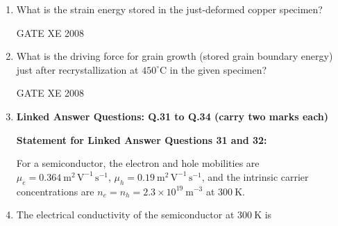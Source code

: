 \documentclass[12pt]{article}
\begin{document}
\begin{enumerate}
\item What is the strain energy stored in the just-deformed copper specimen?

\begin{enumerate}
\end{enumerate}

GATE XE 2008

\item What is the driving force for grain growth (stored grain boundary energy) just after recrystallization at $450^\circ \mathrm{C}$ in the given specimen?

\begin{enumerate}
\end{enumerate}

GATE XE 2008

\item[]\textbf{\Large Linked Answer Questions: Q.31 to Q.34 (carry two marks each)} 

\textbf{Statement for Linked Answer Questions 31 and 32:} 

    For a semiconductor, the electron and hole mobilities are $\mu_e = 0.364 \ \mathrm{m^2 \, V^{-1} \, s^{-1}}$, $\mu_h = 0.19 \ \mathrm{m^2 \, V^{-1} \, s^{-1}}$, and the intrinsic carrier concentrations are $n_e = n_h = 2.3 \times 10^{19} \ \mathrm{m^{-3}}$ at $300 \ \mathrm{K}$.

\item The electrical conductivity of the semiconductor at $300 \ \mathrm{K}$ is

\begin{enumerate}
\end{enumerate}


\end{enumerate}
\end{document}
